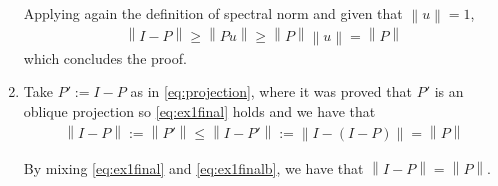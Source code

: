 \documentclass{article}
\providecommand{\norm}[1]{\ensuremath{\left\lVert#1\right\rVert}}
\begin{document}
\begin{enumerate}[label=(\roman*)]
    Applying again the definition of spectral norm and given that $\norm{u}=1$,
    \begin{align}
        \norm{I-P} \geq \norm{Pu} \geq \norm{P} \norm{u} = \norm{P}
        \label{eq:ex1final}
    \end{align}
    which concludes the proof.
    \item Take $P':=I-P$ as in \eqref{eq:projection}, where it was proved that $P'$ is an oblique projection so \eqref{eq:ex1final} holds and we have that
    \begin{align}
        \norm{I-P}:=\norm{P'} \leq \norm{I-P'} := \norm{I-(I-P)} = \norm{P}
        \label{eq:ex1finalb}
    \end{align}
    
    By mixing \eqref{eq:ex1final} and \eqref{eq:ex1finalb}, we have that $\norm{I-P}=\norm{P}$.
\end{enumerate}
\end{document}
